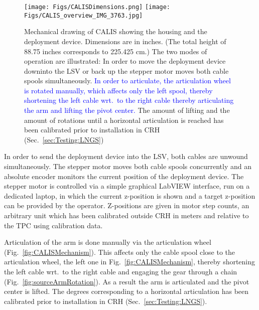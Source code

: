 \begin{figure}[htbp]
 \centering
 \texttt{[image: Figs/CALISDimensions.png]}
 \texttt{[image: Figs/CALIS\_overview\_IMG\_3763.jpg]}
 \caption{%
Mechanical drawing of CALIS showing the housing and the deployment device. Dimensions are in inches. (The total height of 88.75 inches corresponds to 225.425 cm.) The two modes of operation are illustrated: In order to move the deployment device downinto the LSV or back up the stepper motor moves both cable spools simultaneously. \textcolor{blue}{In order to articulate, the articulation wheel is rotated manually, which affects only the left spool, thereby shortening the left cable wrt.~to the right cable thereby articulating the arm and lifting the pivot center.} The amount of lifting and the amount of rotations until a horizontal articulation is reached has been calibrated prior to installation in CRH (Sec.~\ref{sec:Testing:LNGS})\label{fig:CALISDimensions}\label{fig:CALISMechanism}\label{fig:gearDrawing}
}
\end{figure}

In order to send the deployment device into the LSV, both cables are unwound simultaneously. The stepper motor moves both cable spools concurrently and an absolute encoder monitors the current position of the deployment device. The stepper motor is controlled via a simple graphical LabVIEW interface, run on a dedicated laptop, in which the current z-position is shown and a target z-position can be provided by the operator. Z-positions are given in motor step counts, an arbitrary unit which has been calibrated outside CRH in meters and relative to the TPC using calibration data.

Articulation of the arm is done manually via the articulation wheel (Fig.~\ref{fig:CALISMechanism}). This affects only the cable spool close to the articulation wheel, the left one in Fig.~\ref{fig:CALISMechanism}, thereby shortening the left cable wrt.~to the right cable and engaging the gear through a chain (Fig.~\ref{fig:sourceArmRotation}). As a result the arm is articulated and the pivot center is lifted. The degrees corresponding to a horizontal articulation has been calibrated prior to installation in CRH (Sec.~\ref{sec:Testing:LNGS}).

